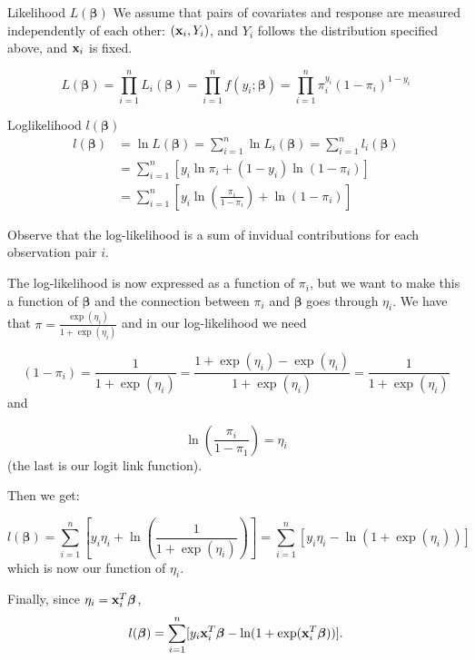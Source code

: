 \documentclass[
  ignorenonframetext,
]{beamer}
\begin{document}
\begin{frame}
\begin{block}{Likelihood \(L(\boldsymbol{\beta})\)}
\label{likelihood-lboldsymbolbeta}
We assume that pairs of covariates and response are measured
independently of each other: \(({\bf x}_i,Y_i)\), and \(Y_i\) follows
the distribution specified above, and \({\bf x}_i\) is fixed.

\[L(\boldsymbol{\beta})=\prod_{i=1}^n L_i(\boldsymbol{\beta})=\prod_{i=1}^n f(y_i; \boldsymbol{\beta})=\prod_{i=1}^n\pi_i^{y_i}(1-\pi_i)^{1-y_i}\]
\end{block}
\end{frame}

\begin{frame}
\begin{block}{Loglikelihood \(l(\boldsymbol{\beta})\)}
\label{loglikelihood-lboldsymbolbeta}
\begin{align}
l(\boldsymbol{\beta})&=\ln L(\boldsymbol{\beta})=\sum_{i=1}^n \ln L_i(\boldsymbol{\beta})=\sum_{i=1}^n l_i(\boldsymbol{\beta})\\
&=\sum_{i=1}^n[y_i \ln \pi_i+(1-y_i) \ln(1-\pi_i)]\\
&=\sum_{i=1}^n[y_i \ln (\frac{\pi_i}{1-\pi_i})+\ln(1-\pi_i)]
\end{align}

Observe that the log-likelihood is a sum of invidual contributions for
each observation pair \(i\).
\end{block}
\end{frame}

\begin{frame}
The log-likelihood is now expressed as a function of \(\pi_i\), but we
want to make this a function of \(\boldsymbol{\beta}\) and the
connection between \(\pi_i\) and \(\boldsymbol{\beta}\) goes through
\(\eta_i\). We have that \(\pi=\frac{\exp(\eta_i)}{1+\exp(\eta_i)}\) and
in our log-likelihood we need

\[(1-\pi_i)=\frac{1}{1+\exp(\eta_i)}=\frac{1+\exp(\eta_i)-\exp(\eta_i)}{1+\exp(\eta_i)}=\frac{1}{1+\exp(\eta_i)}\]
and

\[\ln(\frac{\pi_i}{1-\pi_1})=\eta_i\] (the last is our logit link
function).
\end{frame}

\begin{frame}
Then we get:

\[l(\boldsymbol{\beta})=\sum_{i=1}^n[y_i \eta_i + \ln (\frac{1}{1+\exp(\eta_i)})]=\sum_{i=1}^n[y_i \eta_i - \ln (1+\exp(\eta_i))]\]
which is now our function of \(\eta_i\).

Finally, since \(\eta_i={\bf x}_i^T \boldsymbol{\beta}\),
\[l(\boldsymbol{\beta})=\sum_{i=1}^n[y_i {\bf x}_i^T \boldsymbol{\beta} - \ln (1+\exp({\bf x}_i^T \boldsymbol{\beta}))].\]
\end{frame}
\end{document}
